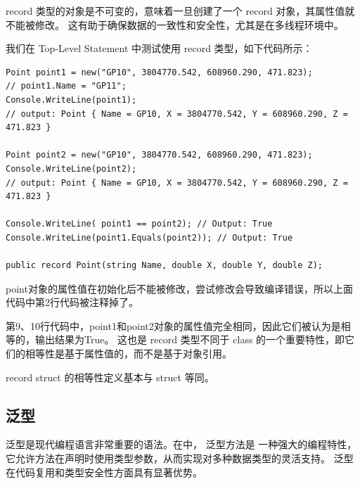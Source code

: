 record 类型的对象是不可变的，意味着一旦创建了一个 record 对象，其属性值就不能被修改。
这有助于确保数据的一致性和安全性，尤其是在多线程环境中。

我们在 Top-Level Statement 中测试使用 record 类型，如下代码所示：

\begin{lstlisting}
Point point1 = new("GP10", 3804770.542, 608960.290, 471.823);
// point1.Name = "GP11";
Console.WriteLine(point1);
// output: Point { Name = GP10, X = 3804770.542, Y = 608960.290, Z = 471.823 }

Point point2 = new("GP10", 3804770.542, 608960.290, 471.823);
Console.WriteLine(point2);
// output: Point { Name = GP10, X = 3804770.542, Y = 608960.290, Z = 471.823 }

Console.WriteLine( point1 == point2); // Output: True
Console.WriteLine(point1.Equals(point2)); // Output: True

public record Point(string Name, double X, double Y, double Z);
\end{lstlisting}

point对象的属性值在初始化后不能被修改，尝试修改会导致编译错误，所以上面代码中第2行代码被注释掉了。

第9、10行代码中，point1和point2对象的属性值完全相同，因此它们被认为是相等的，输出结果为True。
这也是 record 类型不同于 class 的一个重要特性，即它们的相等性是基于属性值的，而不是基于对象引用。

record struct 的相等性定义基本与 struct 等同。





\subsection{泛型}

泛型是现代编程语言非常重要的语法。在\cs 中， 泛型方法是 一种强大的编程特性，
它允许方法在声明时使用类型参数，从而实现对多种数据类型的灵活支持。
泛型在代码复用和类型安全性方面具有显著优势。

